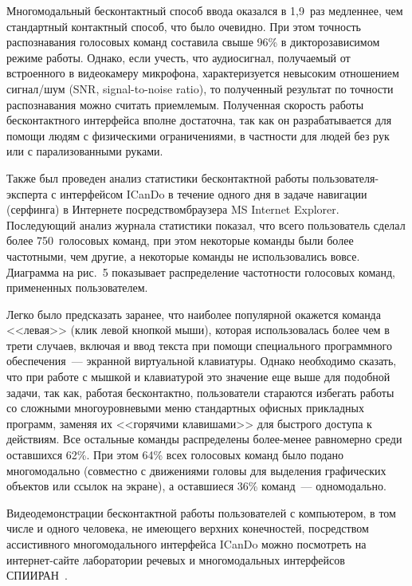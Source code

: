 \begin{multicols}{2}
  Многомодальный бесконтактный способ ввода оказался в 1,9~раз медленнее, 
чем стандартный контактный способ, что было очевидно. При этом точность 
распознавания голосовых команд составила свыше 96\% в дикторозависимом 
режиме работы. Однако, если учесть, что аудиосигнал, по\-лу\-ча\-емый от 
встроенного в видеокамеру микрофона, характеризуется невысоким 
отношением сигнал/шум (SNR, signal-to-noise ratio), то полученный результат по точности 
распознавания можно считать приемлемым. Полученная скорость работы 
бесконтактного интерфейса вполне достаточна, так как он разрабатывается для 
помощи людям с физическими ограничениями, в частности для людей без рук 
или с парализованными руками. 
  
  Также был проведен анализ статистики бес\-контактной работы пользователя-эксперта 
  с ин\-тер\-фейсом ICanDo в течение одного дня в задаче навигации 
(серфинга) в Интернете посредством\linebreak браузера MS Internet Explorer. 
Последующий анализ журнала статистики показал, что всего пользователь 
сделал более 750~голосовых команд, при этом некоторые команды были более 
частотными, чем другие, а некоторые команды не использовались вовсе. 
Диаграмма на рис.~5 показывает распределение частотности голосовых команд, 
примененных пользователем. 


  Легко было предсказать заранее, что наиболее популярной окажется команда 
<<левая>> (клик левой кнопкой мыши), которая использовалась более чем в 
трети случаев, включая и ввод текста при помощи специального программного 
обеспечения~--- экранной виртуальной клавиатуры. Однако необходимо сказать, 
что при работе с мышкой и клавиатурой это значение еще выше для подобной 
задачи, так как, работая бесконтактно, пользователи стараются избегать работы 
со сложными многоуровневыми меню стандартных офисных прикладных 
программ, заменяя их <<горячими клавишами>> для быстрого доступа к 
действиям. Все остальные команды распределены более-менее равномерно 
среди оставшихся 62\%. При этом 64\% всех голосовых команд было подано 
многомодально (совместно с движениями головы для выделения графических 
объектов или ссылок на экране), а оставшиеся 36\% команд~--- одномодально. 
  
  Видеодемонстрации бесконтактной работы пользователей с компьютером, в 
том числе и одного человека, не имеющего верхних конечностей, посредством 
ассистивного многомодального интерфейса ICanDo можно посмотреть на 
ин\-тер\-нет-сай\-те лаборатории речевых и многомодальных интерфейсов 
СПИИРАН~\cite{21kar}. 


\end{multicols}
